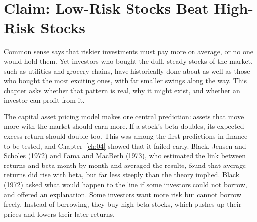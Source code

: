 \makeatletter
{}
\makeatother

\makeatletter
\makeatother

\chapter{Claim: Low-Risk Stocks Beat High-Risk Stocks}
\label{ch:18}

Common sense says that riskier investments must pay more on average, or no one would hold them. Yet investors who bought the dull, steady stocks of the market, such as utilities and grocery chains, have historically done about as well as those who bought the most exciting ones, with far smaller swings along the way. This chapter asks whether that pattern is real, why it might exist, and whether an investor can profit from it.

The capital asset pricing model makes one central prediction: assets that move more with the market should earn more. If a stock's beta doubles, its expected excess return should double too. This was among the first predictions in finance to be tested, and Chapter~\ref{ch:04} showed that it failed early. Black, Jensen and Scholes (1972) and Fama and MacBeth (1973), who estimated the link between returns and beta month by month and averaged the results, found that average returns did rise with beta, but far less steeply than the theory implied. Black (1972) asked what would happen to the line if some investors could not borrow, and offered an explanation. Some investors want more risk but cannot borrow freely. Instead of borrowing, they buy high-beta stocks, which pushes up their prices and lowers their later returns.


